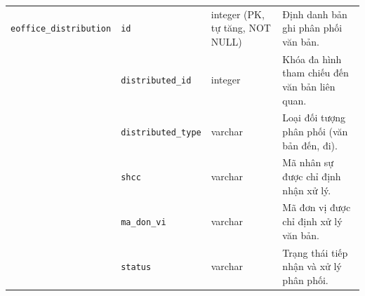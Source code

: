 \begin{xltabular}{\textwidth}{|L{2.7cm}|L{2.6cm}|L{4.2cm}|Y|}
\hline
\texttt{eoffice\_distribution} & \texttt{id} & integer (PK, tự tăng, NOT NULL) & Định danh bản ghi phân phối văn bản. \\
 & \texttt{distributed\_id} & integer & Khóa đa hình tham chiếu đến văn bản liên quan. \\
 & \texttt{distributed\_type} & varchar & Loại đối tượng phân phối (văn bản đến, đi). \\
 & \texttt{shcc} & varchar & Mã nhân sự được chỉ định nhận xử lý. \\
 & \mbox{\texttt{ma\_don\_vi}} & varchar & Mã đơn vị được chỉ định xử lý văn bản. \\
 & \texttt{status} & varchar & Trạng thái tiếp nhận và xử lý phân phối. \\
\end{xltabular}
